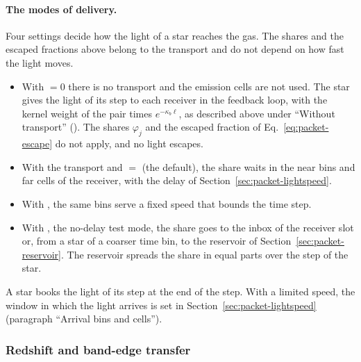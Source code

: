 \paragraph{The modes of delivery.} Four settings decide how the light of a
star reaches the gas. The shares and the escaped fractions above belong to the
transport and do not depend on how fast the light moves.
\begin{itemize}
  \item With  $=0$ there is no transport
    and the emission cells are not used. The star gives the light of its step
    to each receiver in the feedback loop, with the kernel weight of the pair
    times $e^{-\kappa_b\ell}$, as described above under ``Without transport''
    (). The shares
    $\varphi_j$ and the escaped fraction of Eq.~\eqref{eq:packet-escape} do
    not apply, and no light escapes.
  \item With the transport and  $=$
     (the default), the share waits in the near bins and far cells
    of the receiver, with the delay of Section~\ref{sec:packet-lightspeed}.
  \item With , the same bins serve a fixed speed that bounds the
    time step.
  \item With , the no-delay test mode, the share goes to the
    inbox of the receiver slot or, from a star of a coarser time bin, to the
    reservoir of Section~\ref{sec:packet-reservoir}. The reservoir spreads the
    share in equal parts over the step of the star.
\end{itemize}
A star books the light of its step at the end of the step. With a limited
speed, the window in which the light arrives is set in
Section~\ref{sec:packet-lightspeed} (paragraph ``Arrival bins and cells'').

\subsubsection{Redshift and band-edge transfer}
\label{sec:packet-transfer}

